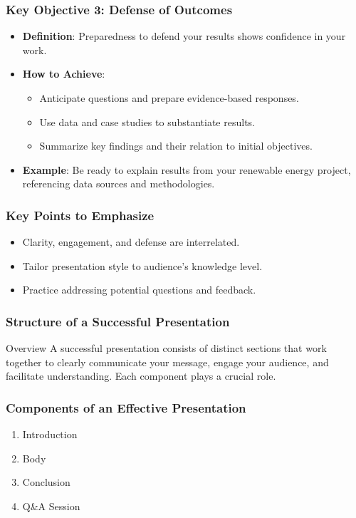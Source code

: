 \documentclass[aspectratio=169]{beamer}
\begin{document}
\begin{frame}[fragile]
  \frametitle{Key Objective 3: Defense of Outcomes}
  \begin{itemize}
    \item \textbf{Definition}: Preparedness to defend your results shows confidence in your work.
    \item \textbf{How to Achieve}:
      \begin{itemize}
        \item Anticipate questions and prepare evidence-based responses.
        \item Use data and case studies to substantiate results.
        \item Summarize key findings and their relation to initial objectives.
      \end{itemize}
    \item \textbf{Example}: Be ready to explain results from your renewable energy project, referencing data sources and methodologies.
  \end{itemize}
\end{frame}

\begin{frame}[fragile]
  \frametitle{Key Points to Emphasize}
  \begin{itemize}
    \item Clarity, engagement, and defense are interrelated.
    \item Tailor presentation style to audience's knowledge level.
    \item Practice addressing potential questions and feedback.
  \end{itemize}
\end{frame}

\begin{frame}[fragile]
    \frametitle{Structure of a Successful Presentation}
    \begin{block}{Overview}
        A successful presentation consists of distinct sections that work together to clearly communicate your message, engage your audience, and facilitate understanding. Each component plays a crucial role.
    \end{block}
\end{frame}

\begin{frame}[fragile]
    \frametitle{Components of an Effective Presentation}
    \begin{enumerate}
        \item Introduction
        \item Body
        \item Conclusion
        \item Q\&A Session
    \end{enumerate}
\end{frame}
\end{document}
